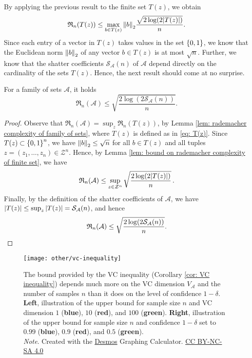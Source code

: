 By applying the previous result to the finite set $T(z)$, we obtain
\[
    \mathfrak{R}_n(T(z)) \leq \max_{b \in T(z)} \norm{b}_2 \frac{\sqrt{2 \log(2 \abs{T(z)})}}{n}.
\]
Since each entry of a vector in $T(z)$ takes values in the set $\set{0, 1}$, we know that the Euclidean norm $\norm{b}_2$ of any vector $b \in T(z)$ is at most $\sqrt{n}$. Further, we know that the shatter coefficients $\mathcal{S}_{\mathcal{A}}(n)$ of $\mathcal{A}$ depend directly on the cardinality of the sets $T(z)$. Hence, the next result should come at no surprise.

\begin{proposition}
\label{prop: bound on rademacher complexity of family of sets}
For a family of sets $\mathcal{A}$, it holds
\[
    \mathfrak{R}_n(\mathcal{A}) \leq \sqrt{\frac{2 \log(2 \mathcal{S}_{\mathcal{A}}(n)) }{n}}.
\]
\end{proposition}

\begin{proof}
Observe that $\mathfrak{R}_n(\mathcal{A}) = \sup_z \mathfrak{R}_n(T(z))$, by Lemma \ref{lem: rademacher complexity of family of sets}, where $T(z)$ is defined as in \eqref{eq: T(z)}. Since $T(z) \subset \set{0, 1}^n$, we have $\norm{b}_2 \leq \sqrt{n}$ for all $b \in T(z)$ and all tuples $z = (z_1, \dots, z_n) \in \mathcal{Z}^n$. Hence, by Lemma \ref{lem: bound on rademacher complexity of finite set}, we have
\[
    \mathfrak{R}_n(\mathcal{A}) \leq \sup_{z \in \mathcal{Z}^n} \sqrt{\frac{2 \log(2 \abs{T(z)})}{n}} \, .
\]
Finally, by the definition of the shatter coefficients of $\mathcal{A}$, we have $\abs{T(z)} \leq \sup_z \abs{T(z)} = \mathcal{S}_{\mathcal{A}}(n)$, and hence
\[
    \mathfrak{R}_n(\mathcal{A}) \leq \sqrt{\frac{2 \log(2 \mathcal{S}_{\mathcal{A}}(n)) }{n}}. \qedhere
\]
\end{proof}

\begin{figure}
    \centering
    \texttt{[image: other/vc-inequality]}
    \caption{%
         The bound provided by the VC inequality (Corollary \ref{cor: VC inequality}) depends much more on the VC dimension $V_{\mathcal{A}}$ and the number of samples $n$ than it does on the level of confidence $1 - \delta$. \textbf{Left}, illustration of the upper bound for sample size $n$ and VC dimension $1$ (\textcolor{desmos-blue}{\textbf{blue}}), $10$ (\textcolor{desmos-red}{\textbf{red}}), and $100$ (\textcolor{desmos-green}{\textbf{green}}). \textbf{Right}, illustration of the upper bound for sample size $n$ and confidence $1 - \delta$ set to $0.99$ (\textcolor{desmos-blue}{\textbf{blue}}), $0.9$ (\textcolor{desmos-red}{\textbf{red}}), and $0.5$ (\textcolor{desmos-green}{\textbf{green}}). \\
        \indent\emph{Note}. Created with the \href{https://www.desmos.com}{Desmos} Graphing Calculator. \href{https://creativecommons.org/licenses/by-nc-sa/4.0/}{CC BY-NC-SA 4.0}
    }
    \label{fig: VC inequality}
\end{figure}

